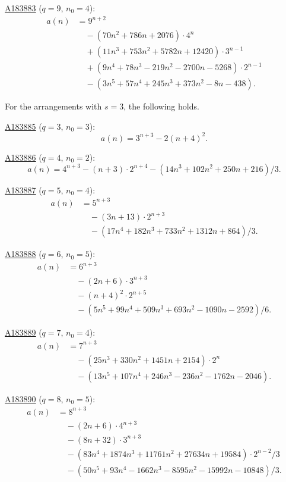 \documentclass[12pt,reqno]{article}
\newcommand{\seqnum}[1]{\href{https://oeis.org/#1}{\rm \underline{#1}}}
\begin{document}
\begin{theorem}
\noindent\seqnum{A183883} ($q=9$, $n_0 = 4$):
\begin{align*}
a(n) &= 9^{n+2} \\
&\quad - (70n^{2}+786n+2076)\cdot 4^n \\
&\quad + (11n^{3}+753n^{2}+5782n+12420)\cdot 3^{n-1} \\
&\quad + (9n^{4}+78n^{3}-219n^{2}-2700n-5268)\cdot 2^{n-1} \\
&\quad - (3n^{5}+57n^{4}+245n^{3}+373n^{2}-8n-438).
\end{align*}

\end{theorem}

\begin{theorem}\label{thm:explicit3}
For the arrangements with $s = 3$, the following holds.

\noindent\seqnum{A183885} ($q=3$, $n_0 = 3$):
\[ a(n) = 3^{n+3} - 2(n+4)^{2}. \]

\noindent\seqnum{A183886} ($q=4$, $n_0 = 2$):
\[ a(n) = 4^{n+3} - (n+3)\cdot 2^{n+4} - (14n^{3}+102n^{2}+250n+216)/3. \]

\noindent\seqnum{A183887} ($q=5$, $n_0 = 4$):
\begin{align*}
a(n) &= 5^{n+3} \\
&\quad - (3n+13)\cdot 2^{n+3} \\
&\quad - (17n^{4}+182n^{3}+733n^{2}+1312n+864)/3.
\end{align*}

\noindent\seqnum{A183888} ($q=6$, $n_0 = 5$):
\begin{align*}
a(n) &= 6^{n+3} \\
&\quad - (2n+6)\cdot 3^{n+3} \\
&\quad - (n+4)^{2}\cdot 2^{n+5} \\
&\quad - (5n^{5}+99n^{4}+509n^{3}+693n^{2}-1090n-2592)/6.
\end{align*}

\noindent\seqnum{A183889} ($q=7$, $n_0 = 4$):
\begin{align*}
a(n) &= 7^{n+3} \\
&\quad - (25n^{3}+330n^{2}+1451n+2154)\cdot 2^n \\
&\quad - (13n^{5}+107n^{4}+246n^{3}-236n^{2}-1762n-2046).
\end{align*}

\noindent\seqnum{A183890} ($q=8$, $n_0 = 5$):
\begin{align*}
a(n) &= 8^{n+3} \\
&\quad - (2n+6)\cdot 4^{n+3} \\
&\quad - (8n+32)\cdot 3^{n+3} \\
&\quad - (83n^{4}+1874n^{3}+11761n^{2}+27634n+19584)\cdot 2^{n-2}/3 \\
&\quad - (50n^{5}+93n^{4}-1662n^{3}-8595n^{2}-15992n-10848)/3.
\end{align*}


\end{theorem}
\end{document}

